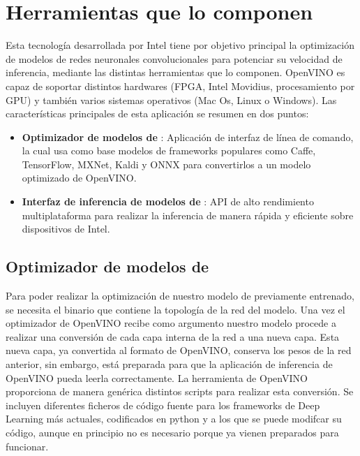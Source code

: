 \section{Herramientas que lo componen}\label{sec:herramientas-que-lo-componen}
Esta tecnología desarrollada por Intel tiene por objetivo principal la optimización de modelos de redes neuronales convolucionales para potenciar su velocidad de inferencia, mediante las distintas herramientas que lo componen.
OpenVINO es capaz de soportar distintos hardwares (FPGA, Intel Movidius, procesamiento por GPU\@) y también varios sistemas operativos (Mac Os, Linux o Windows).
Las características principales de esta aplicación se resumen en dos puntos:
\begin{itemize}
    \item \textbf{Optimizador de modelos de }: Aplicación de interfaz de línea de comando, la cual usa como base modelos de frameworks populares como Caffe, TensorFlow, MXNet, Kaldi y ONNX para convertirlos a un modelo optimizado de OpenVINO.
    \item \textbf{Interfaz de inferencia de modelos de }: API de alto rendimiento multiplataforma para realizar la inferencia de manera rápida y eficiente sobre dispositivos de Intel.
\end{itemize}

\subsection{Optimizador de modelos de }\label{subsec:optimizador-de-modelos-de-deep-learning}
Para poder realizar la optimización de nuestro modelo de  previamente entrenado, se necesita el binario que contiene la topología de la red del modelo.
Una vez el optimizador de OpenVINO recibe como argumento nuestro modelo procede a realizar una conversión de cada capa interna de la red a una nueva capa.
Esta nueva capa, ya convertida al formato de OpenVINO, conserva los pesos de la red anterior,
sin embargo, está preparada para que la aplicación de inferencia de OpenVINO pueda leerla correctamente.
La herramienta de OpenVINO proporciona de manera genérica distintos scripts para realizar esta conversión.
Se incluyen diferentes ficheros de código fuente para los frameworks de Deep Learning más actuales, codificados en python y a los que se puede modifcar su código, aunque en principio no es necesario porque ya vienen preparados para funcionar.

